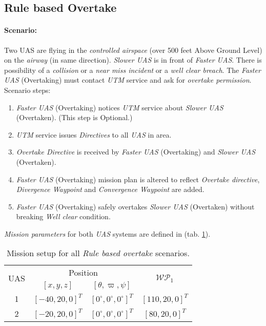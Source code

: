 \subsection{Rule based Overtake}\label{s:testRuleOvertake}
    \paragraph{Scenario:} Two UAS are flying in the \emph{controlled airspace} (over 500 feet Above Ground Level) on the \emph{airway} (in same direction). \emph{Slower UAS} is in front of \emph{Faster UAS}. There is possibility of a \emph{collision} or a \emph{near miss incident} or a \emph{well clear breach}. The \emph{Faster UAS} (Overtaking) must contact \emph{UTM} service and ask for \emph{overtake permission}. Scenario steps:
    
    \begin{enumerate}
        \item \emph{Faster UAS} (Overtaking) notices \emph{UTM} service about \emph{Slower UAS} (Overtaken). (This step is Optional.)
        
        \item \emph{UTM} service issues \emph{Directives} to all \emph{UAS} in area.
        
        \item \emph{Overtake Directive} is received by \emph{Faster UAS} (Overtaking) and \emph{Slower UAS} (Overtaken).
        
        \item \emph{Faster UAS} (Overtaking) mission plan is altered to reflect \emph{Overtake directive}, \emph{Divergence Waypoint} and \emph{Convergence Waypoint} are added.
        
        \item \emph{Faster UAS} (Overtaking) safely overtakes \emph{Slower UAS} (Overtaken) without breaking \emph{Well clear} condition.
    \end{enumerate}
    
    \noindent\emph{Mission parameters} for both \emph{UAS} systems are defined in (tab. \ref{tab:missionSetupRuleBasedOvertakeScenarios}).
    
    \begin{table}[H]
        \centering
        \begin{tabular}{c||c|c||c}
            \multirow{2}{*}{UAS} &\multicolumn{2}{c||}{Position} & \multirow{2}{*}{$\mathscr{WP}_1$} \\\cline{2-3}
              & $[x,y,z]$           & $[\theta,\varpi,\psi]$           & \\\hline\hline
            1 & $[-40,20,0]^T $       & $[0^\circ,0^\circ,0^\circ]^T$    & $[110,20,0]^T$\\\hline 
            2 & $[-20,20,0]^T $       & $[0^\circ,0^\circ,0^\circ]^T$    & $[80,20,0]^T$\\
        \end{tabular}
        \caption{Mission setup for all \emph{Rule based overtake} scenarios.}
        \label{tab:missionSetupRuleBasedOvertakeScenarios}
    \end{table}


